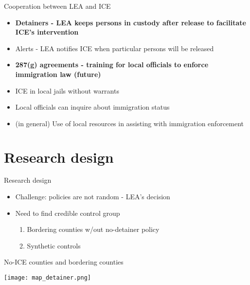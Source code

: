 \documentclass[xcolor=pdftex,dvipsnames,table]{beamer}
\begin{document}
\begin{frame}{Cooperation between LEA and ICE}
\begin{itemize}
\item \textbf{Detainers - LEA keeps persons in custody after release to facilitate ICE's intervention}
\item Alerts - LEA notifies ICE when particular persons will be released
\item \textbf{287(g) agreements - training for local officials to enforce immigration law (future)}
\item ICE in local jails without warrants
\item Local officials can inquire about immigration status
\item (in general)  Use of local resources in assisting with immigration enforcement
\end{itemize}
\end{frame}

\section{Research design}

\begin{frame}{Research design}
\begin{itemize}
\item Challenge: policies are not random - LEA's decision
\item Need to find credible control group
\begin{enumerate}
\item Bordering counties w/out no-detainer policy
\item Synthetic controls
\end{enumerate}
\end{itemize}
\end{frame}

\begin{frame}{No-ICE counties and bordering counties}
\begin{center}
\texttt{[image: map\_detainer.png]}
\end{center}
\end{frame}
\end{document}
